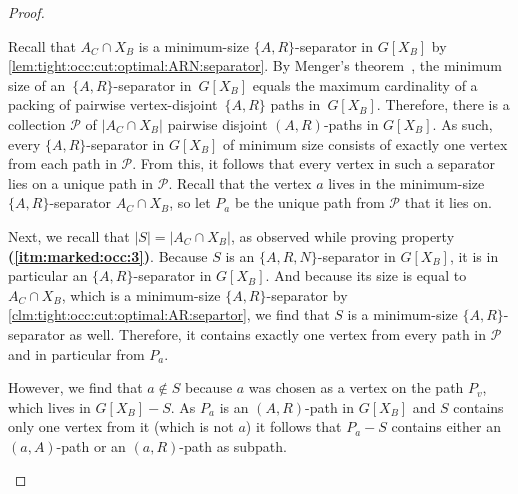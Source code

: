 \begin{proof}
\begin{claimproof}
		
		Recall that $A_C \cap X_B$ is a minimum-size $\{A, R\}$-separator in $G[X_B]$ by \cref{lem:tight:occ:cut:optimal:ARN:separator}. By Menger's theorem~\cite[Theorem 9.1]{Schrijver03}, the minimum size of an~$\{A,R\}$-separator in~$G[X_B]$ equals the maximum cardinality of a packing of pairwise vertex-disjoint~$\{A,R\}$ paths in~$G[X_B]$.  Therefore, there is a collection $\mathcal{P}$ of $|A_C \cap X_B|$ pairwise disjoint $(A, R)$-paths in $G[X_B]$. As such, every $\{A, R\}$-separator in $G[X_B]$ of minimum size consists of exactly one vertex from each path in $\mathcal{P}$. From this, it follows that every vertex in such a separator lies on a unique path in $\mathcal{P}$. Recall that the vertex $a$ lives in the minimum-size $\{A, R\}$-separator $A_C \cap X_B$, so let $P_a$ be the unique path from $\mathcal{P}$ that it lies on.
		
		Next, we recall that $|S| = |A_C \cap X_B|$, as observed while proving property \textbf{(\ref{itm:marked:occ:3})}. Because $S$ is an $\{A, R, N\}$-separator in $G[X_B]$, it is in particular an $\{A, R\}$-separator in $G[X_B]$. And because its size is equal to $A_C \cap X_B$, which is a minimum-size $\{A, R\}$-separator by \cref{clm:tight:occ:cut:optimal:AR:separtor}, we find that $S$ is a minimum-size $\{A, R\}$-separator as well. Therefore, it contains exactly one vertex from every path in $\mathcal{P}$ and in particular from $P_a$.
		
		However, we find that $a \notin S$ because $a$ was chosen as a vertex on the path $P_v$, which lives in $G[X_B] - S$. As $P_a$ is an $(A, R)$-path in $G[X_B]$ and $S$ contains only one vertex from it (which is not $a$) it follows that $P_a - S$ contains either an $(a, A)$-path or an $(a, R)$-path as subpath.
		

\end{claimproof}
\end{proof}

